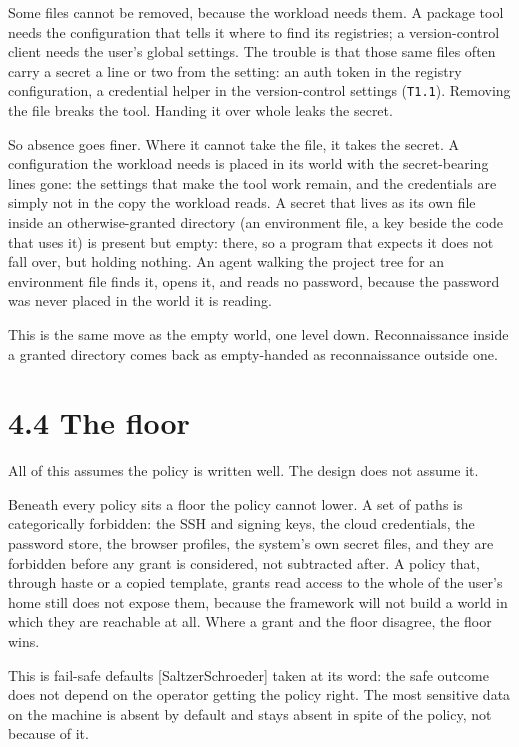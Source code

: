 Some files cannot be removed, because the workload needs them. A package
tool needs the configuration that tells it where to find its registries;
a version-control client needs the user's global settings. The trouble
is that those same files often carry a secret a line or two from the
setting: an auth token in the registry configuration, a credential
helper in the version-control settings (\texttt{T1.1}). Removing the
file breaks the tool. Handing it over whole leaks the secret.

So absence goes finer. Where it cannot take the file, it takes the
secret. A configuration the workload needs is placed in its world with
the secret-bearing lines gone: the settings that make the tool work
remain, and the credentials are simply not in the copy the workload
reads. A secret that lives as its own file inside an otherwise-granted
directory (an environment file, a key beside the code that uses it) is
present but empty: there, so a program that expects it does not fall
over, but holding nothing. An agent walking the project tree for an
environment file finds it, opens it, and reads no password, because the
password was never placed in the world it is reading.

This is the same move as the empty world, one level down. Reconnaissance
inside a granted directory comes back as empty-handed as reconnaissance
outside one.

\hypertarget{the-floor}{%
\section{4.4 The floor}\label{the-floor}}

All of this assumes the policy is written well. The design does not
assume it.

Beneath every policy sits a floor the policy cannot lower. A set of
paths is categorically forbidden: the SSH and signing keys, the cloud
credentials, the password store, the browser profiles, the system's own
secret files, and they are forbidden before any grant is considered, not
subtracted after. A policy that, through haste or a copied template,
grants read access to the whole of the user's home still does not expose
them, because the framework will not build a world in which they are
reachable at all. Where a grant and the floor disagree, the floor wins.

This is fail-safe defaults {[}SaltzerSchroeder{]} taken at its word: the
safe outcome does not depend on the operator getting the policy right.
The most sensitive data on the machine is absent by default and stays
absent in spite of the policy, not because of it.

